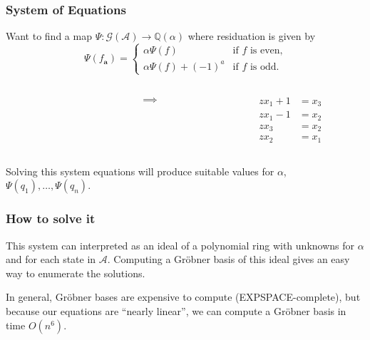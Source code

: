 \documentclass{beamer}
\newcommand{\Q}{\mathbb{Q}}
\newcommand{\ch}[1]{\mathbf{#1}}
\newcommand{\A}{\mathcal{A}}
\newcommand{\gp}{\mathcal{G}}
\newcommand{\res}[2]{{{#1}_{\ch{#2}}}}
\begin{document}
\begin{frame}
    \frametitle{System of Equations}
    Want to find a map $\Psi : \gp(\A) \rightarrow \Q(\alpha)$ where
    residuation is given by
    \[
        \Psi(\res{f}{a}) = \begin{cases}
            \alpha \Psi(f) & \text{if $f$ is even,}\\
            \alpha \Psi(f) + (-1)^a & \text{if $f$ is odd.}
        \end{cases}
    \]

    \begin{columns}
    \begin{column}{0.33\textwidth}
        \begin{center}
            \scalebox{.8}{\usebox{\ccc}}
        \end{center}
    \end{column}
    \begin{column}{0.33\textwidth}
        \LARGE
        \begin{align*}
            \implies
        \end{align*}
    \end{column}
    \begin{column}{0.33\textwidth}
        \begin{align*}
            z x_1 + 1 &= x_3\\
            z x_1 - 1 &= x_2\\
            z x_3 &= x_2\\
            z x_2 &= x_1
        \end{align*}
    \end{column}
    \end{columns}
    \pause
    \vspace{.5cm}

    Solving this system equations will produce suitable values for $\alpha$,
    $\Psi(q_1), \ldots, \Psi(q_n)$.
\end{frame}

\begin{frame}
    \frametitle{How to solve it}
    This system can interpreted as an ideal of a polynomial ring with unknowns
    for $\alpha$ and for each state in $\A$. Computing a Gr\"obner basis of
    this ideal gives an easy way to enumerate the solutions.
    \pause

    \vspace{.5cm}
    In general, Gr\"obner bases are expensive to compute (EXPSPACE-complete),
    but because our equations are ``nearly linear'', we can compute a Gr\"obner
    basis in time $O(n^6)$.
\end{frame}
\end{document}
